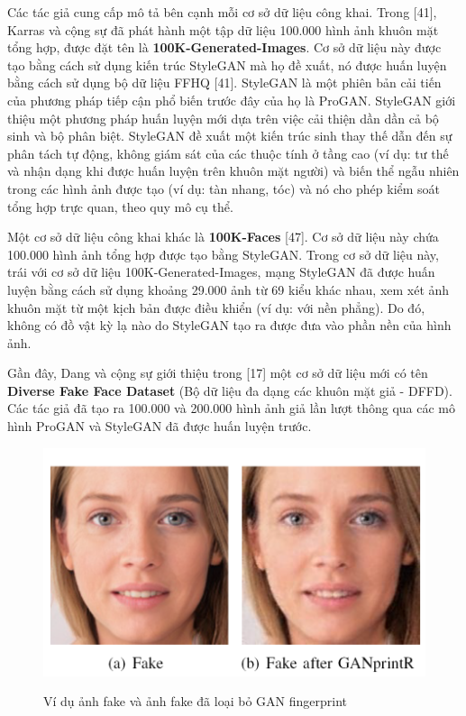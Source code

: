 \documentclass{article}
\begin{document}
Các tác giả cung cấp mô tả bên cạnh mỗi cơ sở dữ liệu công khai. Trong [41], Karras và cộng sự đã phát hành một tập dữ liệu 100.000 hình ảnh khuôn mặt tổng hợp, được đặt tên là \textbf{100K-Generated-Images}. Cơ sở dữ liệu này được tạo bằng cách sử dụng kiến trúc StyleGAN mà họ đề xuất, nó được huấn luyện bằng cách sử dụng bộ dữ liệu FFHQ [41]. StyleGAN là một phiên bản cải tiến của phương pháp tiếp cận phổ biến trước đây của họ là ProGAN. StyleGAN giới thiệu một phương pháp huấn luyện mới dựa trên việc cải thiện dần dần cả bộ sinh và bộ phân biệt. StyleGAN đề xuất một kiến trúc sinh thay thế dẫn đến sự phân tách tự động, không giám sát của các thuộc tính ở tầng cao (ví dụ: tư thế và nhận dạng khi được huấn luyện trên khuôn mặt người) và biến thể ngẫu nhiên trong các hình ảnh được tạo (ví dụ: tàn nhang, tóc) và nó cho phép kiểm soát tổng hợp trực quan, theo quy mô cụ thể.

Một cơ sở dữ liệu công khai khác là \textbf{100K-Faces} [47]. Cơ sở dữ liệu này chứa 100.000 hình ảnh tổng hợp được tạo bằng StyleGAN. Trong cơ sở dữ liệu này, trái với cơ sở dữ liệu 100K-Generated-Images, mạng StyleGAN đã được huấn luyện bằng cách sử dụng khoảng 29.000 ảnh từ 69 kiểu khác nhau, xem xét ảnh khuôn mặt từ một kịch bản được điều khiển (ví dụ: với nền phẳng). Do đó, không có đồ vật kỳ lạ nào do StyleGAN tạo ra được đưa vào phần nền của hình ảnh.

Gần đây, Dang và cộng sự giới thiệu trong [17] một cơ sở dữ liệu mới có tên \textbf{Diverse Fake Face Dataset} (Bộ dữ liệu đa dạng các khuôn mặt giả - DFFD). Các tác giả đã tạo ra 100.000 và 200.000 hình ảnh giả lần lượt thông qua các mô hình ProGAN và StyleGAN đã được huấn luyện trước.

\begin{figure}[h!]
\caption{Ví dụ ảnh fake và ảnh fake đã loại bỏ GAN fingerprint}
\includegraphics[width=\columnwidth]{fig-2-example}
\label{fig-2-example}
\end{figure}
\end{document}
